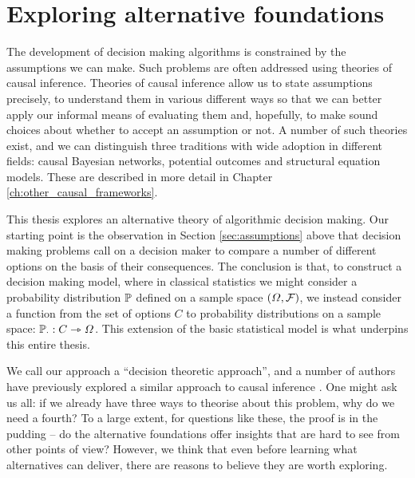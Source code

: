 \section{Exploring alternative foundations}

The development of decision making algorithms is constrained by the assumptions we can make. Such problems are often addressed using theories of causal inference. Theories of causal inference allow us to state assumptions precisely, to understand them in various different ways so that we can better apply our informal means of evaluating them and, hopefully, to make sound choices about whether to accept an assumption or not. A number of such theories exist, and we can distinguish three traditions with wide adoption in different fields: causal Bayesian networks, potential outcomes and structural equation models. These are described in more detail in Chapter \ref{ch:other_causal_frameworks}.

This thesis explores an alternative theory of algorithmic decision making. Our starting point is the observation in Section \ref{sec:assumptions} above that decision making problems call on a decision maker to compare a number of different options on the basis of their consequences. The conclusion is that, to construct a decision making model, where in classical statistics we might consider a probability distribution $\mathbb{P}$ defined on a sample space $(\Omega,\mathcal{F})$, we instead consider a function from the set of options $C$ to probability distributions on a sample space: $\mathbb{P}_\cdot:C\rightarrowtriangle \Omega$. This extension of the basic statistical model is what underpins this entire thesis.

We call our approach a ``decision theoretic approach'', and a number of authors have previously explored a similar approach to causal inference \citep{heckerman_decision-theoretic_1995,dawid_causal_2000,dawid_influence_2002,dawid_decision-theoretic_2012,dawid_decision-theoretic_2020}. One might ask us all: if we already have three ways to theorise about this problem, why do we need a fourth? To a large extent, for questions like these, the proof is in the pudding -- do the alternative foundations offer insights that are hard to see from other points of view? However, we think that even before learning what alternatives can deliver, there are reasons to believe they are worth exploring.

